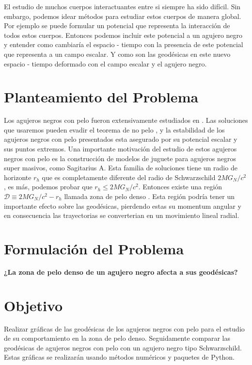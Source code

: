\documentclass[../Main.tex]{subfiles}
\begin{document}
El estudio de muchos cuerpos interactuantes entre si siempre ha sido difícil. Sin embargo, podemos idear métodos para estudiar estos cuerpos de manera global. Por ejemplo se puede formular un potencial que representa la interacción de todos estos cuerpos. Entonces podemos incluir este potencial a un agujero negro y entender como cambiaría el espacio - tiempo con la presencia de este potencial que representa a un campo escalar. Y como son las geodésicas en este nuevo espacio - tiempo deformado con el campo escalar y el agujero negro.

\section{Planteamiento del Problema}
Los agujeros negros con pelo fueron extensivamente estudiados en \cite{Anabalon:2013sra,Acena:2013jya}. Las soluciones que usaremos pueden evadir el teorema de no pelo \cite{Hertog:2006rr}, y la estabilidad de los agujeros negros con pelo presentados esta asegurado por su potencial escalar y sus puntos extremos.
Una importante motivación del estudio  de estos agujeros negros con pelo es la construcción de modelos de juguete para agujeros negros super masivos, como Sagitarius A. Esta familia de soluciones tiene un radio de horizonte $r_h$ que es completamente diferente del radio de Schwarzschild $2MG_{N}/c^{2}$, es más, podemos probar que $r_{h}\leq 2MG_{N}/c^{2}$. Entonces existe una región $\mathcal{D}\equiv 2MG_{N}/c^{2}-r_{h}$ llamada zona de pelo denso \cite{}. Esta región podría tener un importante efecto sobre las geodésicas, pierdendo estas su momentum angular y en consecuencia las trayectorias se converterian en un movimiento lineal radial.

\section{Formulación del Problema}
\textbf{¿La zona de pelo denso de un agujero negro afecta a sus geodésicas?}

\section{Objetivo}
Realizar gráficas de las geodésicas de los agujeros negros con pelo para el estudio de su comportamiento en la zona de pelo denso. Seguidamente comparar las geodésicas de agujeros negros con pelo con un agujero negro tipo Schwarzschild. Estas gráficas se realizarán usando métodos numéricos y paquetes de Python.
\end{document}
